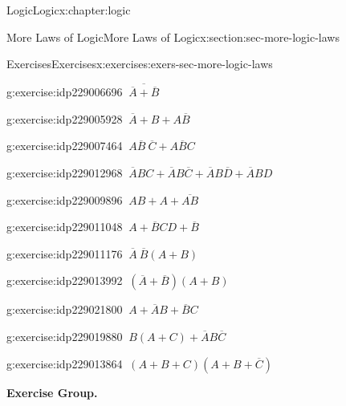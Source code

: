 \documentclass[twoside,10pt,]{book}
\numberwithin{equation}{section}
\begin{document}
\begin{chapterptx}{Logic}{}{Logic}{}{}{x:chapter:logic}
\begin{sectionptx}{More Laws of Logic}{}{More Laws of Logic}{}{}{x:section:sec-more-logic-laws}
\begin{exercises-subsection}{Exercises}{}{Exercises}{}{}{x:exercises:exers-sec-more-logic-laws}
\begin{exercisegroup}
\begin{divisionexerciseeg}{30}{}{}{g:exercise:idp229006696}%
\(\ \overline{\overline{A}{} + \overline{B}{}}\)\end{divisionexerciseeg}%
\begin{divisionexerciseeg}{31}{}{}{g:exercise:idp229005928}%
\(\ \overline{A}{}  + B + A\overline{B}{}\)\end{divisionexerciseeg}%
\begin{divisionexerciseeg}{32}{}{}{g:exercise:idp229007464}%
\(\ A\overline{B}{}~\overline{C}{}  + A\overline{B}{}C\)\end{divisionexerciseeg}%
\begin{divisionexerciseeg}{33}{}{}{g:exercise:idp229012968}%
\(\ \overline{A}{} BC + \overline{A}{}B\overline{C}{}  + \overline{A}{} B\overline{D}{} + \overline{A}{}BD\)\end{divisionexerciseeg}%
\begin{divisionexerciseeg}{34}{}{}{g:exercise:idp229009896}%
\(\ AB + A + \overline{AB}\)\end{divisionexerciseeg}%
\begin{divisionexerciseeg}{35}{}{}{g:exercise:idp229011048}%
\(\ A + \overline{B}{}CD + \overline{B}{}\)\end{divisionexerciseeg}%
\begin{divisionexerciseeg}{36}{}{}{g:exercise:idp229011176}%
\(\ \overline{A}{}~ \overline{B}{} (A + B)\)\end{divisionexerciseeg}%
\begin{divisionexerciseeg}{37}{}{}{g:exercise:idp229013992}%
\(\ (\overline{A}{} + \overline{B}{})(A + B)\)\end{divisionexerciseeg}%
\begin{divisionexerciseeg}{38}{}{}{g:exercise:idp229021800}%
\(\ A + \overline{A}{} B + \overline{B}{}C \)\end{divisionexerciseeg}%
\begin{divisionexerciseeg}{39}{}{}{g:exercise:idp229019880}%
\(\ B(A + C) + \overline{A}{} B\overline{C}{}\)\end{divisionexerciseeg}%
\begin{divisionexerciseeg}{40}{}{}{g:exercise:idp229013864}%
\(\ (A + B + C)(A + B + \overline{C}{})\)\end{divisionexerciseeg}%
\end{exercisegroup}
\par\medskip\noindent
\par\medskip\noindent%
\textbf{Exercise Group.}\space\space%

\end{exercises-subsection}
\end{sectionptx}
\end{chapterptx}
\end{document}
